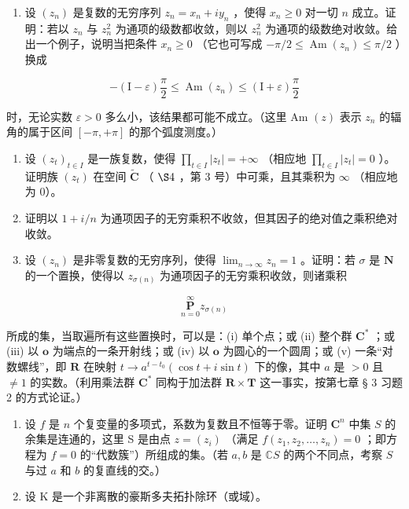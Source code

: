 \begin{enumerate}
\def\labelenumi{\arabic{enumi})}
\setcounter{enumi}{1}
\tightlist
\item
  设 \((z_{n})\) 是复数的无穷序列 \(z_{n} = x_{n} + iy_{n}\) ，使得 \(x_{n} \geqslant 0\) 对一切 \(n\) 成立。证明：若以 \(z_{n}\) 与 \(z_{n}^{2}\) 为通项的级数都收敛，则以 \(z_{n}^{2}\) 为通项的级数绝对收敛。给出一个例子，说明当把条件 \(x_{n} \geqslant 0\) （它也可写成 \(-\pi / 2 \leqslant \operatorname{Am}(z_{n}) \leqslant \pi / 2\) ）换成
\end{enumerate}

\[
- (\mathrm{I} - \varepsilon) \frac {\pi}{2} \leqslant \operatorname{Am} (z _ {n}) \leqslant (\mathrm{I} + \varepsilon) \frac {\pi}{2}
\]

时，无论实数 \(\varepsilon > 0\) 多么小，该结果都可能不成立。（这里 Am \((z)\) 表示 \(z_{n}\) 的辐角的属于区间 \([- \pi, +\pi]\) 的那个弧度测度。）

\begin{enumerate}
\def\labelenumi{\arabic{enumi})}
\setcounter{enumi}{2}
\item
  设 \((z_{t})_{t\in I}\) 是一族复数，使得 \(\prod_{t\in I}|z_t| = +\infty\) （相应地 \(\prod_{t\in I}|z_t| = 0\) ）。证明族 \((z_{t})\) 在空间 \(\tilde{\mathbf{C}}\) （ \(\S 4\) ，第 3 号）中可乘，且其乘积为 \(\infty\) （相应地为 0）。
\item
  证明以 \(1 + i/n\) 为通项因子的无穷乘积不收敛，但其因子的绝对值之乘积绝对收敛。
\item
  设 \((z_{n})\) 是非零复数的无穷序列，使得 \(\lim_{n\to \infty}z_n = 1\) 。证明：若 \(\sigma\) 是 \(\mathbf{N}\) 的一个置换，使得以 \(z_{\sigma (n)}\) 为通项因子的无穷乘积收敛，则诸乘积
\end{enumerate}

\[
\underset {n = 0} {\overset {\infty} {\mathbf {P}}} z _ {\sigma (n)}
\]

所成的集，当取遍所有这些置换时，可以是：(i) 单个点；或 (ii) 整个群 \(\mathbf{C}^*\) ；或 (iii) 以 \(\mathbf{o}\) 为端点的一条开射线；或 (iv) 以 \(\mathbf{o}\) 为圆心的一个圆周；或 (v) 一条“对数螺线”，即 \(\mathbf{R}\) 在映射 \(t \to a^{t - t_0} (\cos t + i \sin t)\) 下的像，其中 \(a\) 是 \(>0\) 且 \(\neq 1\) 的实数。（利用乘法群 \(\mathbf{C}^*\) 同构于加法群 \(\mathbf{R} \times \mathbf{T}\) 这一事实，按第七章 § 3 习题 2 的方式论证。）

\ExerciseSection

\begin{enumerate}
\def\labelenumi{\arabic{enumi})}
\item
  设 \(f\) 是 \(n\) 个复变量的多项式，系数为复数且不恒等于零。证明 \(\mathbf{C}^n\) 中集 \(S\) 的余集是连通的，这里 S 是由点 \(z = (z_i)\) （满足 \(f(z_1, z_2, \ldots, z_n) = 0\) ；即方程为 \(f = 0\) 的“代数簇”）所组成的集。（若 \(a, b\) 是 \(\mathbb{C}S\) 的两个不同点，考察 \(S\) 与过 \(a\) 和 \(b\) 的复直线的交。）
\item
  设 K 是一个非离散的豪斯多夫拓扑除环（或域）。
\end{enumerate}

